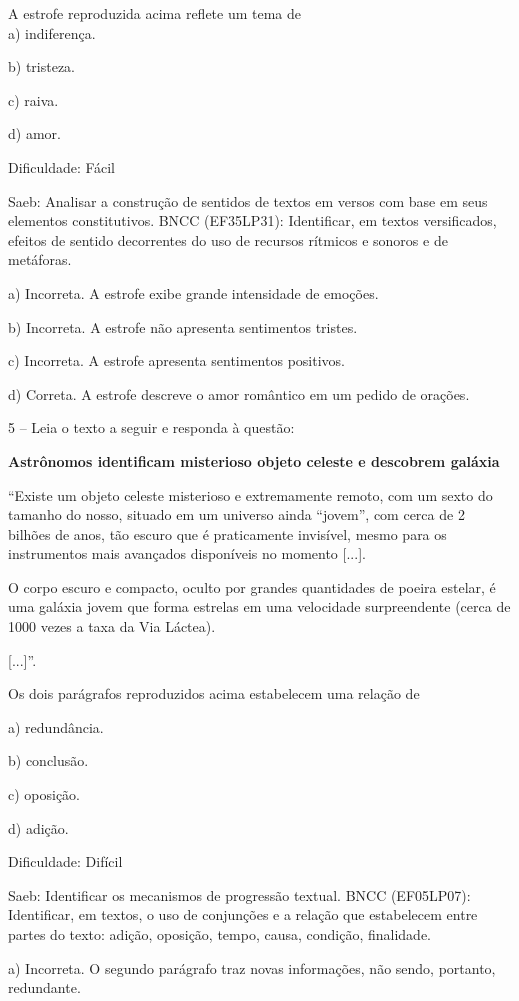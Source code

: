 A estrofe reproduzida acima reflete um tema de\\
a) indiferença.

b) tristeza.

c) raiva.

d) amor.

Dificuldade: Fácil

Saeb: Analisar a construção de sentidos de textos em versos com base em
seus elementos constitutivos. BNCC (EF35LP31): Identificar, em textos
versificados, efeitos de sentido decorrentes do uso de recursos rítmicos
e sonoros e de metáforas.

a) Incorreta. A estrofe exibe grande intensidade de emoções.

b) Incorreta. A estrofe não apresenta sentimentos tristes.

c) Incorreta. A estrofe apresenta sentimentos positivos.

d) Correta. A estrofe descreve o amor romântico em um pedido de orações.

5 -- Leia o texto a seguir e responda à questão:

\textbf{Astrônomos identificam misterioso objeto celeste e descobrem
galáxia}

``Existe um objeto celeste misterioso e extremamente remoto, com um
sexto do tamanho do nosso, situado em um universo ainda ``jovem'', com
cerca de 2 bilhões de anos, tão escuro que é praticamente invisível,
mesmo para os instrumentos mais avançados disponíveis no momento
{[}...{]}.

O corpo escuro e compacto, oculto por grandes quantidades de poeira
estelar, é uma galáxia jovem que forma estrelas em uma velocidade
surpreendente (cerca de 1000 vezes a taxa da Via Láctea).

{[}...{]}''.

Os dois parágrafos reproduzidos acima estabelecem uma relação de

a) redundância.

b) conclusão.

c) oposição.

d) adição.

Dificuldade: Difícil

Saeb: Identificar os mecanismos de progressão textual. BNCC (EF05LP07):
Identificar, em textos, o uso de conjunções e a relação que estabelecem
entre partes do texto: adição, oposição, tempo, causa, condição,
finalidade.

a) Incorreta. O segundo parágrafo traz novas informações, não sendo,
portanto, redundante.

